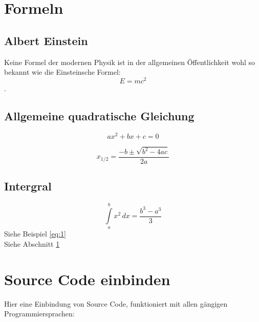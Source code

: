 \section{Formeln}
\label{sec:formeln}

\subsection{Albert Einstein}
Keine Formel der modernen Physik ist in der allgemeinen \"Offentlichkeit wohl so bekannt wie die Einsteinsche Formel:
\begin{equation*}
  E = mc^2
\end{equation*}.

\subsection{Allgemeine quadratische Gleichung}
\begin{equation*}
  ax^2 + bx + c = 0
\end{equation*}

\begin{equation*}
  x_{1/2} = \frac{-b \pm \sqrt{b^2-4ac}}{2a}
\end{equation*}

\subsection{Intergral}
\begin{equation}
  \label{eq:1}
  \int\limits_{a}^{b} x^{2} \, dx = \frac{ b^{3} - a^{3} }{3}
\end{equation}
Siehe Beispiel \eqref{eq:1} \\
Siehe Abschnitt \ref{sec:formeln}

\section{Source Code einbinden}
Hier eine Einbindung von Source Code, funktioniert mit allen g\"angigen Programmiersprachen:

